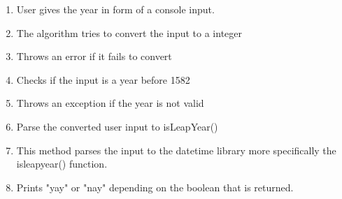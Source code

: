 \documentclass{article}
\begin{document}
\begin{figure}
    \centering
\end{figure}
\begin{enumerate}
    \item User gives the year in form of a console input.
    \item The algorithm tries to convert the input to a integer
    \item Throws an error if it fails to convert
    \item Checks if the input is a year before 1582
    \item Throws an exception if the year is not valid
    \item Parse the converted user input to isLeapYear()
    \item This method parses the input to the datetime library more specifically the isleapyear() function.
    \item Prints "yay" or "nay" depending on the boolean that is returned.
\end{enumerate}
\end{document}
